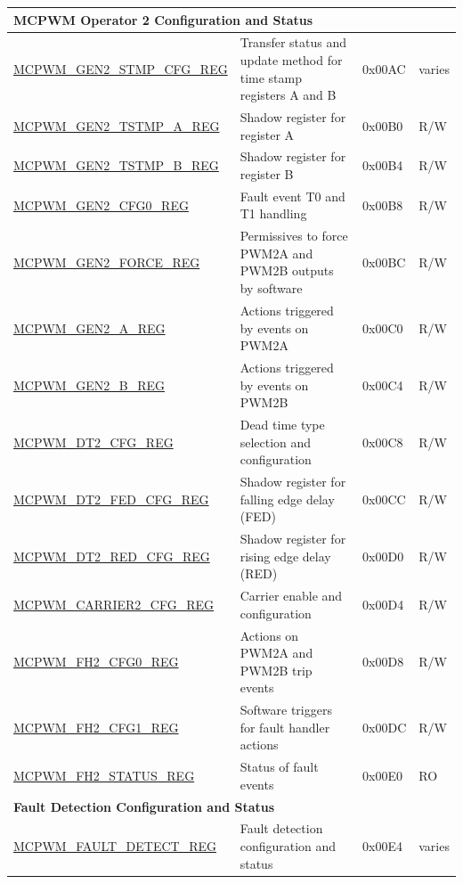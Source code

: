 \begin{longtable}{ | p{6cm} | p{7.2cm} | p{1.3cm} | p{1cm} | }
\multicolumn{4}{|l|}{\textbf{MCPWM Operator 2 Configuration and Status}} \\ \hline
\hyperref[regdesc:MCPWMGENNSTMPCFGREG]{MCPWM\_GEN2\_STMP\_CFG\_REG} & Transfer status and update method for time stamp registers A and B & 0x00AC & varies \\ \hline
\hyperref[regdesc:MCPWMGENNTSTMPAREG]{MCPWM\_GEN2\_TSTMP\_A\_REG} & Shadow register for register A & 0x00B0 & R/W \\ \hline
\hyperref[regdesc:MCPWMGENNTSTMPBREG]{MCPWM\_GEN2\_TSTMP\_B\_REG} & Shadow register for register B & 0x00B4 & R/W \\ \hline
\hyperref[regdesc:MCPWMGENNCFG0REG]{MCPWM\_GEN2\_CFG0\_REG} & Fault event T0 and T1 handling & 0x00B8 & R/W \\ \hline
\hyperref[regdesc:MCPWMGENNFORCEREG]{MCPWM\_GEN2\_FORCE\_REG} & Permissives to force PWM2A and PWM2B outputs by software & 0x00BC & R/W \\ \hline
\hyperref[regdesc:MCPWMGENNAREG]{MCPWM\_GEN2\_A\_REG} & Actions triggered by events on PWM2A & 0x00C0 & R/W \\ \hline
\hyperref[regdesc:MCPWMGENNBREG]{MCPWM\_GEN2\_B\_REG} & Actions triggered by events on PWM2B & 0x00C4 & R/W \\ \hline
\hyperref[regdesc:MCPWMDTNCFGREG]{MCPWM\_DT2\_CFG\_REG} & Dead time type selection and configuration & 0x00C8 & R/W \\ \hline
\hyperref[regdesc:MCPWMDTNFEDCFGREG]{MCPWM\_DT2\_FED\_CFG\_REG} & Shadow register for falling edge delay (FED) & 0x00CC & R/W \\ \hline
\hyperref[regdesc:MCPWMDTNREDCFGREG]{MCPWM\_DT2\_RED\_CFG\_REG} & Shadow register for rising edge delay (RED) & 0x00D0 & R/W \\ \hline
\hyperref[regdesc:MCPWMCARRIERNCFGREG]{MCPWM\_CARRIER2\_CFG\_REG} & Carrier enable and configuration & 0x00D4 & R/W \\ \hline
\hyperref[regdesc:MCPWMFHNCFG0REG]{MCPWM\_FH2\_CFG0\_REG} & Actions on PWM2A and PWM2B trip events & 0x00D8 & R/W \\ \hline
\hyperref[regdesc:MCPWMFHNCFG1REG]{MCPWM\_FH2\_CFG1\_REG} & Software triggers for fault handler actions & 0x00DC & R/W \\ \hline
\hyperref[regdesc:MCPWMFHNSTATUSREG]{MCPWM\_FH2\_STATUS\_REG} & Status of fault events & 0x00E0 & RO \\ \hline

\multicolumn{4}{|l|}{\textbf{Fault Detection Configuration and Status}} \\ \hline
\hyperref[regdesc:MCPWMFAULTDETECTREG]{MCPWM\_FAULT\_DETECT\_REG} & Fault detection configuration and status & 0x00E4 & varies \\ \hline


\end{longtable}
